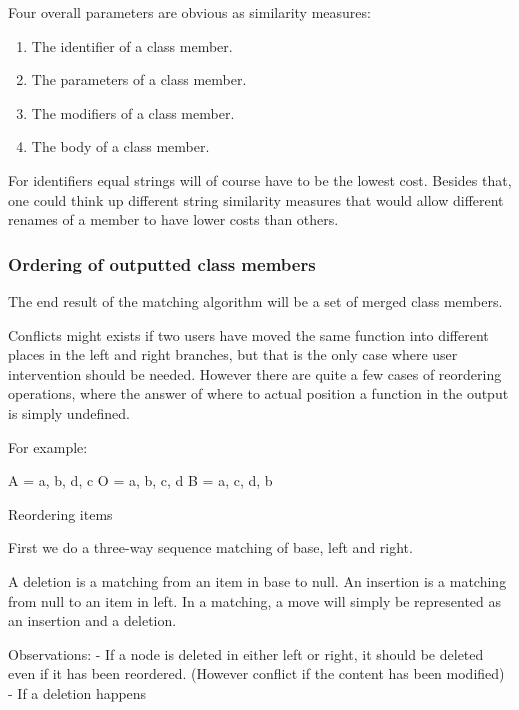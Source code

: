 \documentclass[11pt]{article}
\begin{document}
Four overall parameters are obvious as similarity measures:

\begin{enumerate}
    \item The identifier of a class member.
    \item The parameters of a class member.
    \item The modifiers of a class member.
    \item The body of a class member.
\end{enumerate}

For identifiers equal strings will of course have to be the lowest cost. Besides that, one could think up different string similarity measures that would allow different renames of a member to have lower costs than others.

\subsubsection{Ordering of outputted class members}
The end result of the matching algorithm will be a set of merged class members. 

Conflicts might exists if two users have moved the same function into different places in the left and right branches, but that is the only case where user intervention should be needed. However there are quite a few cases of reordering operations, where the answer of where to actual position a function in the output is simply undefined. 

For example:

A = { a, b, d, c }
O = { a, b, c, d }
B = { a, c, d, b }


Reordering items 

First we do a three-way sequence matching of base, left and right. 

A deletion is a matching from an item in base to null.
An insertion is a matching from null to an item in left.
In a matching, a move will simply be represented as an insertion and a deletion.



Observations:
- If a node is deleted in either left or right, it should be deleted even if it has been reordered. (However conflict if the content has been modified)
- If a deletion happens 


\end{document}
